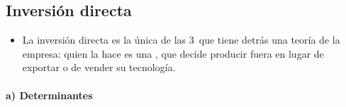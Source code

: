\documentclass[11pt]{article}
\begin{document}
\subsection{Inversión directa}\label{sec:ied}

\begin{itemize}
\item La inversión directa es la única de las 3~que tiene detrás una teoría de la empresa: quien la hace es una , que decide producir fuera en lugar de exportar o de vender su tecnología.
\end{itemize}

\paragraph{a) Determinantes}
\end{document}
